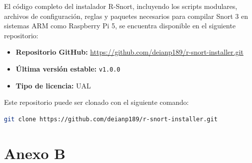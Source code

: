 \documentclass[11pt,a4paper,twoside]{report}
\begin{document}
El código completo del instalador R-Snort, incluyendo los scripts modulares, archivos de configuración, reglas y paquetes necesarios para compilar Snort 3 en sistemas ARM como Raspberry Pi 5, se encuentra disponible en el siguiente repositorio:

\begin{itemize}
	\item \textbf{Repositorio GitHub:} \url{https://github.com/deianp189/r-snort-installer.git}
	\item \textbf{Última versión estable:} \texttt{v1.0.0}
	\item \textbf{Tipo de licencia:} UAL
\end{itemize}

Este repositorio puede ser clonado con el siguiente comando:

\begin{lstlisting}[language=bash]
	git clone https://github.com/deianp189/r-snort-installer.git
\end{lstlisting}

\chapter{Anexo B}
\end{document}
